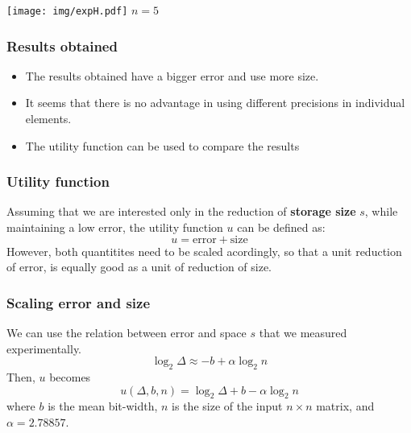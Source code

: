 \documentclass[serif, 12pt]{beamer}
\begin{document}

\begin{frame}

\centering
\texttt{[image: img/expH.pdf]}
$n=5$

\end{frame}


\begin{frame}
\frametitle{Results obtained}

\begin{itemize}

\item The results obtained have a bigger error and use more size.
\item It seems that there is no advantage in using different precisions in 
individual elements.
\item The utility function can be used to compare the results

\end{itemize}

\end{frame}


\begin{frame}
\frametitle{Utility function}

Assuming that we are interested only in the reduction of \textbf{storage size} 
$s$, while maintaining a low error, the utility function $u$ can be defined as:
$$ u = \textrm{error} + \textrm{size} $$
However, both quantitites need to be scaled acordingly, so that a unit reduction 
of error, is equally good as a unit of reduction of size.

\end{frame}


\begin{frame}
\frametitle{Scaling error and size}

We can use the relation between error and space $s$ that we measured 
experimentally.
$$ \log_2 \Delta \approx -b + \alpha \log_2 n $$
Then, $u$ becomes
$$ u(\Delta, b, n) = \log_2 \Delta + b - \alpha \log_2 n $$
where $b$ is the mean bit-width, $n$ is the size of the input $n\times n$ 
matrix, and $\alpha = 2.78857$.

\end{frame}
\end{document}
